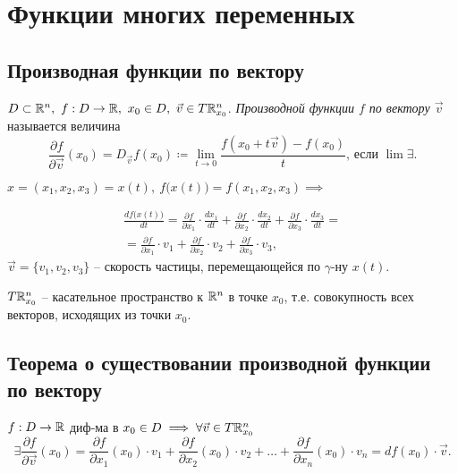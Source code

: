 \section{Функции многих переменных}

\subsection{Производная функции по вектору}

\begin{definition}
    $ D \subset \mathbb{R}^n, \ f:D\rightarrow \mathbb{R}, \ x_0 \in D, \ \vec{v} \in T\mathbb{R}_{x_0}^n $. \emph{Производной функции $ f $ по вектору $ \vec{v} $} называется величина
    \[
        \frac{\partial f}{\partial \vec{v}}(x_0) = D_{\vec{v}} f(x_0) \coloneqq \underset{t \rightarrow 0}{\lim}\frac{f(x_0 + t\vec{v}) - f(x_0)}{t}\text{, если }\lim \exists.
    \]
\end{definition}

\begin{note}
    $ x = (x_1,x_2,x_3) = x(t), \ f\big(x(t)\big) = f(x_1,x_2,x_3) \implies $

    \begin{multline*}
        \frac{df\big(x(t)\big)}{dt} = \frac{\partial f}{\partial x_1} \cdot \frac{dx_1}{dt} + \frac{\partial f}{\partial x_2} \cdot \frac{dx_2}{dt} + \frac{\partial f}{\partial x_3} \cdot \frac{dx_3}{dt} = \\
        = \frac{\partial f}{\partial x_1} \cdot v_1 + \frac{\partial f}{\partial x_2} \cdot v_2 + \frac{\partial f}{\partial x_3} \cdot v_3,
    \end{multline*}
    $ \vec{v} = \{v_1,v_2,v_3\}$ -- скорость частицы, перемещающейся по $\gamma$-ну $x(t)$.

    $ T\mathbb{R}_{x_0}^n $ -- касательное пространство к $ \mathbb{R}^n $ в точке $ x_0 $, т.е. совокупность всех векторов, исходящих из точки $ x_0 $.
\end{note}

\subsection{Теорема о существовании производной функции по вектору}

\begin{statement}
    $ f:D\rightarrow\mathbb{R} $ диф-ма в $ x_0\in D \implies \forall \vec{v}\in T\mathbb{R}_{x_0}^n$
    \[
        \exists\frac{\partial f}{\partial \vec{v}}(x_0) = \frac{\partial f}{\partial x_1}(x_0) \cdot v_1 + \frac{\partial f}{\partial x_2}(x_0) \cdot v_2 + \ldots +\frac{\partial f}{\partial x_n}(x_0) \cdot v_n = df(x_0)\cdot \vec{v}.
    \]
\end{statement}

